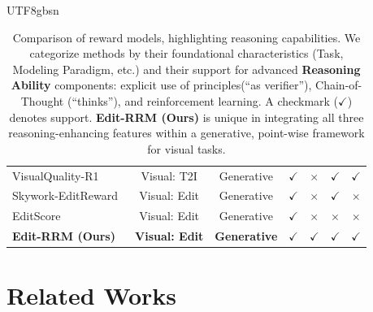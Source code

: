 \documentclass{llmxive}
\begin{document}
\begin{CJK*}{UTF8}{gbsn}
\begin{table}[t]
{\begin{tabular}{l|c|c|c|ccc}
VisualQuality-R1~\citep{wu2025visualquality}         & Visual: T2I          &  Generative  & $\checkmark$ & $\times$     & $\checkmark$  & $\checkmark$     \\
Skywork-EditReward~\citep{wei2025skywork}      & Visual: Edit            &  Generative  & $\checkmark$ & $\times$     & $\checkmark$  & $\times$     \\
EditScore~\citep{luo2025editscore}         & Visual: Edit     & Generative  &$\checkmark$     & $\times$     & $\times$  & $\times$     \\
\textbf{Edit-RRM (Ours)}                      & \textbf{Visual: Edit   } &  \textbf{Generative} & $\checkmark$ & $\checkmark$ & $\checkmark$  & $\checkmark$    \\
\bottomrule
\end{tabular}%
}
\caption{Comparison of reward models, highlighting reasoning capabilities. We categorize methods by their foundational characteristics (Task, Modeling Paradigm, etc.) and their support for advanced \textbf{Reasoning Ability} components: explicit use of principles(``as verifier''), Chain-of-Thought (``thinks''), and reinforcement learning. A checkmark ($\checkmark$) denotes support. \textbf{Edit-RRM (Ours)} is unique in integrating all three reasoning-enhancing features within a generative, point-wise framework for visual tasks.}
\label{tab:main}
\end{table}
\section{Related Works}
\label{sec:realted}


\end{CJK*}
\end{document}
